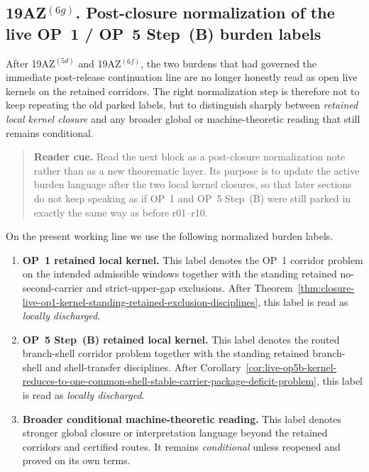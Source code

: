 \subsection*{19AZ$^{(6g)}$. Post-closure normalization of the live OP~1 / OP~5 Step~(B) burden labels}
\label{sec:post-closure-normalization-op1-op5b-burden-labels}
After 19AZ$^{(5d)}$ and 19AZ$^{(6f)}$, the two burdens that had governed the immediate post-release continuation line are no longer honestly read as open live kernels on the retained corridors. The right normalization step is therefore not to keep repeating the old parked labels, but to distinguish sharply between \emph{retained local kernel closure} and any broader global or machine-theoretic reading that still remains conditional.

\begin{quote}\small
\noindent\textbf{Reader cue.} Read the next block as a post-closure normalization note rather than as a new theorematic layer. Its purpose is to update the active burden language after the two local kernel closures, so that later sections do not keep speaking as if OP~1 and OP~5 Step~(B) were still parked in exactly the same way as before r01--r10.
\end{quote}

\begin{definition}
\label{def:post-closure-burden-labels-retained-op-kernels}
On the present working line we use the following normalized burden labels.
\begin{enumerate}[leftmargin=2em]
  \item \textbf{OP~1 retained local kernel.} This label denotes the OP~1 corridor problem on the intended admissible windows together with the standing retained no-second-carrier and strict-upper-gap exclusions. After Theorem~\ref{thm:closure-live-op1-kernel-standing-retained-exclusion-disciplines}, this label is read as \emph{locally discharged}.
  \item \textbf{OP~5 Step~(B) retained local kernel.} This label denotes the routed branch-shell corridor problem together with the standing retained branch-shell and shell-transfer disciplines. After Corollary~\ref{cor:live-op5b-kernel-reduces-to-one-common-shell-stable-carrier-package-deficit-problem}, this label is read as \emph{locally discharged}.
  \item \textbf{Broader conditional machine-theoretic reading.} This label denotes stronger global closure or interpretation language beyond the retained corridors and certified routes. It remains \emph{conditional} unless reopened and proved on its own terms.
\end{enumerate}
\end{definition}

